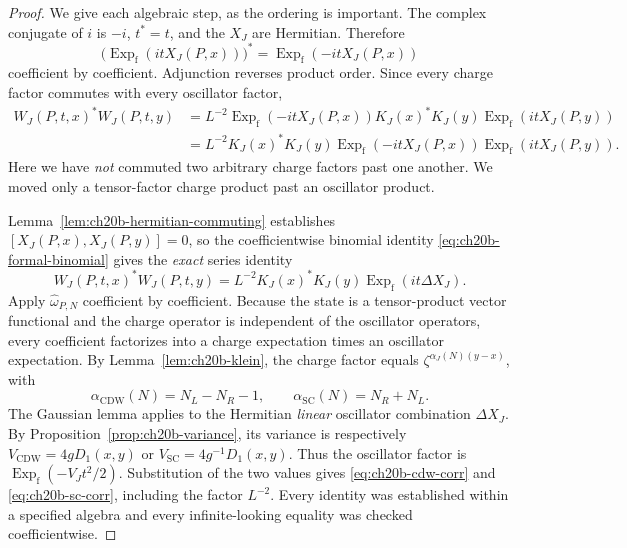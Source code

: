 \begin{proof}
We give each algebraic step, as the ordering is important.  The
complex conjugate of \(i\) is \(-i\), \(t^*=t\), and the \(X_J\)
are Hermitian.  Therefore
\begin{equation}
 \bigl(\operatorname{Exp}_{\mathrm f}(itX_J(P,x))\bigr)^*
 =\operatorname{Exp}_{\mathrm f}(-itX_J(P,x))
 \label{eq:ch20b-star-exp}
\end{equation}
coefficient by coefficient.  Adjunction reverses product order.  Since
every charge factor commutes with every oscillator factor,
\begin{align*}
 W_J(P,t,x)^*W_J(P,t,y)
 &=L^{-2}\operatorname{Exp}_{\mathrm f}(-itX_J(P,x))
      K_J(x)^*K_J(y)
      \operatorname{Exp}_{\mathrm f}(itX_J(P,y))\\
 &=L^{-2}K_J(x)^*K_J(y)
      \operatorname{Exp}_{\mathrm f}(-itX_J(P,x))
      \operatorname{Exp}_{\mathrm f}(itX_J(P,y)).
\end{align*}
Here we have \emph{not} commuted two arbitrary charge factors past
one another.  We moved only a tensor-factor charge product past an
oscillator product.

Lemma~\ref{lem:ch20b-hermitian-commuting} establishes
\([X_J(P,x),X_J(P,y)]=0\), so the
coefficientwise binomial identity
\eqref{eq:ch20b-formal-binomial} gives the \emph{exact} series identity
\begin{equation}
 W_J(P,t,x)^*W_J(P,t,y)
 =L^{-2}K_J(x)^*K_J(y)
   \operatorname{Exp}_{\mathrm f}(it\Delta X_J).
 \label{eq:ch20b-product-series}
\end{equation}
Apply \(\widehat\omega_{P,N}\) coefficient by coefficient.
Because the state is a tensor-product vector functional and the
charge operator is independent of the oscillator operators, every
coefficient factorizes into a charge expectation times an oscillator
expectation.  By Lemma~\ref{lem:ch20b-klein}, the charge factor equals
\(\zeta^{\alpha_J(N)(y-x)}\), with
\[
 \alpha_{\mathrm{CDW}}(N)=N_L-N_R-1,
 \qquad\alpha_{\mathrm{SC}}(N)=N_R+N_L.
\]
The Gaussian lemma applies to the Hermitian \emph{linear} oscillator
combination \(\Delta X_J\).  By
Proposition~\ref{prop:ch20b-variance}, its variance is respectively
\(V_{\mathrm{CDW}}=4gD_1(x,y)\) or
\(V_{\mathrm{SC}}=4g^{-1}D_1(x,y)\).  Thus the oscillator factor is
\(\operatorname{Exp}_{\mathrm f}(-V_Jt^2/2)\).  Substitution of the
two values gives \eqref{eq:ch20b-cdw-corr} and
\eqref{eq:ch20b-sc-corr}, including the factor \(L^{-2}\).
Every identity was established within a specified algebra and every
infinite-looking equality was checked coefficientwise.
\end{proof}

